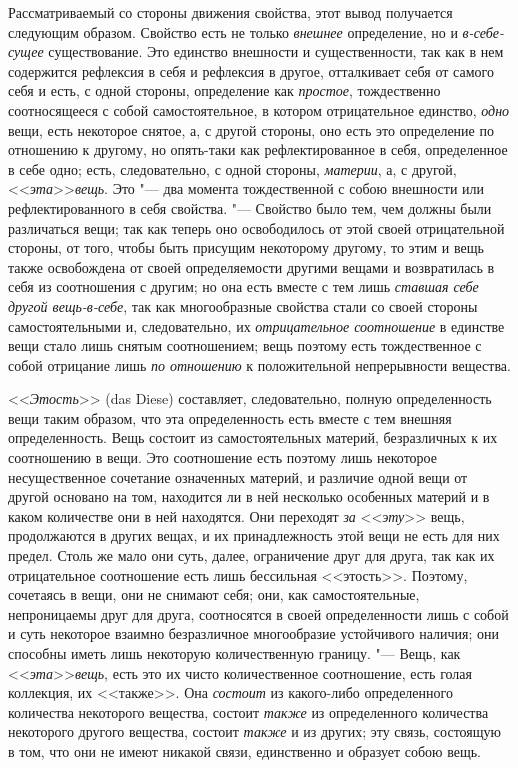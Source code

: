 Рассматриваемый со стороны движения свойства, этот вывод получается
следующим образом. Свойство есть не только {\em внешнее} определение, но и
{\em в-себе-сущее} существование. Это единство
внешности и существенности, так как в нем содержится рефлексия в себя и
рефлексия в другое, отталкивает себя от самого себя и есть, с одной
стороны, определение как {\em простое}, тождественно
соотносящееся с собой самостоятельное, в котором отрицательное единство,
{\em одно} вещи, есть некоторое снятое, а, с другой
стороны, оно есть это определение по отношению к другому, но опять-таки как
рефлектированное в себя, определенное в себе одно; есть, следовательно, с
одной стороны, {\em материи}, а, с другой,
<<{\em эта}>>{\em вещь}. Это "--- два
момента тождественной с собою внешности или рефлектированного в себя
свойства. "--- Свойство было тем, чем должны были различаться вещи; так как
теперь оно освободилось от этой своей отрицательной стороны, от того, чтобы
быть присущим некоторому другому, то этим и вещь также освобождена от своей
определяемости другими вещами и возвратилась в себя из соотношения с
другим; но она есть вместе с тем лишь {\em ставшая себе
другой вещь-в-себе}, так как многообразные свойства стали со своей стороны
самостоятельными и, следовательно, их
{\em отрицательное соотношение} в единстве вещи стало
лишь снятым соотношением; вещь поэтому есть тождественное с собой отрицание
лишь {\em по отношению} к положительной непрерывности вещества.

<<{\em Этость}>> (das Diese) составляет, следовательно,
полную определенность вещи таким образом, что эта определенность есть
вместе с тем внешняя определенность. Вещь состоит из самостоятельных
материй, безразличных к их соотношению в вещи. Это соотношение есть поэтому
лишь некоторое несущественное сочетание означенных материй, и различие
одной вещи от другой основано на том, находится ли в ней несколько
особенных материй и в каком количестве они в ней находятся. Они переходят
{\em за }<<{\em эту}>> вещь,
продолжаются в других вещах, и их принадлежность этой вещи не есть для них
предел. Столь же мало они суть, далее, ограничение друг для друга, так как
их отрицательное соотношение есть лишь бессильная <<этость>>. Поэтому,
сочетаясь в вещи, они не снимают себя; они, как самостоятельные,
непроницаемы друг для друга, соотносятся в своей определенности лишь с
собой и суть некоторое взаимно безразличное многообразие устойчивого
наличия; они способны иметь лишь некоторую количественную границу. "--- Вещь,
как <<{\em эта}>>{\em вещь}, есть
это их чисто количественное соотношение, есть голая коллекция, их <<также>>.
Она {\em состоит} из какого-либо определенного
количества некоторого вещества, состоит {\em также} из
определенного количества некоторого другого вещества, состоит
{\em также} и из других; эту связь, состоящую в том,
что они не имеют никакой связи, единственно и образует собою вещь.



